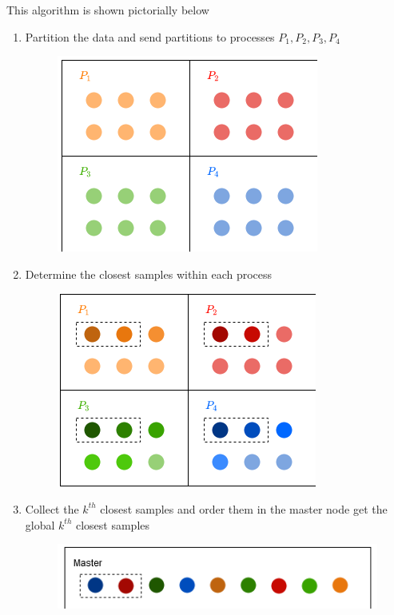 This algorithm is shown pictorially below\\
\renewcommand{\labelenumi}{\textbf{Step \arabic{enumi})}}
\begin{enumerate}
    \item Partition the data and send partitions to processes \(P_{1}, P_{2}, P_{3}, P_{4}\)
    \begin{figure}[H]
        \includegraphics[scale=0.8]{img/STAT4402_tut_KNN_1_no_cap.png}
        \centering
    \end{figure}
    
    \item Determine the closest samples within each process
    \begin{figure}[H]
        \includegraphics[scale=0.8]{img/STAT4402_tut_KNN_2_no_cap.png}
        \centering
    \end{figure}
    
    \item Collect the \(k^{th}\) closest samples and order them in the master node get the global
\(k^{th}\) closest samples
    \begin{figure}[H]
        \includegraphics[scale=0.7]{img/STAT4402_tut_KNN_3_no_cap.png}
        \centering
    \end{figure}
\end{enumerate}